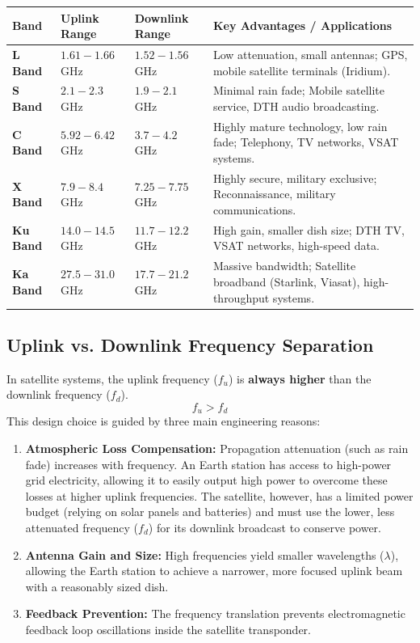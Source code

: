 \documentclass[12pt,a4paper]{article}
\renewcommand{\arraystretch}{1.45}
\begin{document}
\par\noindent
{\renewcommand{\arraystretch}{1.55}%
\begin{tabularx}{\linewidth}{|B{2.2cm}|>{\centering\arraybackslash}m{2.5cm}|>{\centering\arraybackslash}m{2.5cm}|Y|}\hline
\textbf{Band} & \textbf{Uplink Range} & \textbf{Downlink Range} & \textbf{Key Advantages / Applications} \\[4pt]
\hline
\textbf{L Band} & $1.61 - 1.66$ GHz & $1.52 - 1.56$ GHz & Low attenuation, small antennas; GPS, mobile satellite terminals (Iridium). \\[4pt]
\hline
\textbf{S Band} & $2.1 - 2.3$ GHz & $1.9 - 2.1$ GHz & Minimal rain fade; Mobile satellite service, DTH audio broadcasting. \\[4pt]
\hline
\textbf{C Band} & $5.92 - 6.42$ GHz & $3.7 - 4.2$ GHz & Highly mature technology, low rain fade; Telephony, TV networks, VSAT systems. \\[4pt]
\hline
\textbf{X Band} & $7.9 - 8.4$ GHz & $7.25 - 7.75$ GHz & Highly secure, military exclusive; Reconnaissance, military communications. \\[4pt]
\hline
\textbf{Ku Band} & $14.0 - 14.5$ GHz & $11.7 - 12.2$ GHz & High gain, smaller dish size; DTH TV, VSAT networks, high-speed data. \\[4pt]
\hline
\textbf{Ka Band} & $27.5 - 31.0$ GHz & $17.7 - 21.2$ GHz & Massive bandwidth; Satellite broadband (Starlink, Viasat), high-throughput systems. \\[4pt]
\hline
\end{tabularx}
}

\subsection{Uplink vs. Downlink Frequency Separation}
In satellite systems, the uplink frequency ($f_u$) is \textbf{always higher} than the downlink frequency ($f_d$).
\begin{equation}
  f_u > f_d
\end{equation}
This design choice is guided by three main engineering reasons:
\begin{enumerate}[label=\textbf{\alph*.}, leftmargin=*, itemsep=2pt]
  \item \textbf{Atmospheric Loss Compensation:} Propagation attenuation (such as rain fade) increases with frequency. An Earth station has access to high-power grid electricity, allowing it to easily output high power to overcome these losses at higher uplink frequencies. The satellite, however, has a limited power budget (relying on solar panels and batteries) and must use the lower, less attenuated frequency ($f_d$) for its downlink broadcast to conserve power.
  \item \textbf{Antenna Gain and Size:} High frequencies yield smaller wavelengths ($\lambda$), allowing the Earth station to achieve a narrower, more focused uplink beam with a reasonably sized dish.
  \item \textbf{Feedback Prevention:} The frequency translation prevents electromagnetic feedback loop oscillations inside the satellite transponder.
\end{enumerate}
\end{document}
